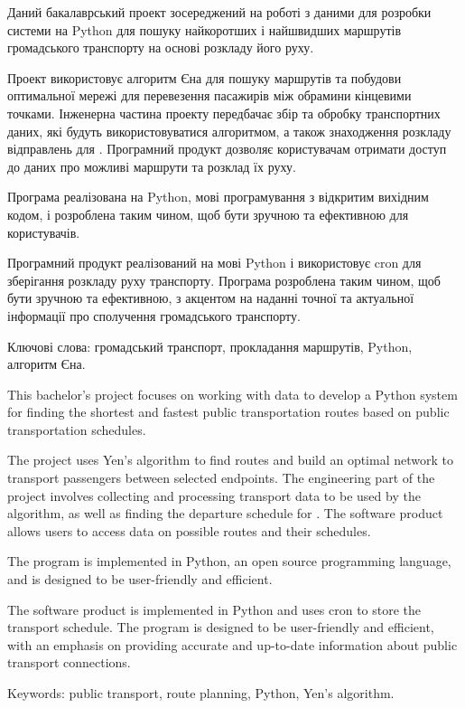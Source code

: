 \abstractUkr


Даний бакалаврський проект зосереджений на роботі з даними для розробки системи на Python для пошуку найкоротших і найшвидших маршрутів громадського транспорту на основі розкладу його руху. 

Проект використовує алгоритм Єна для пошуку маршрутів та побудови оптимальної мережі для перевезення пасажирів між обрамини кінцевими точками. Інженерна частина проекту передбачає збір та обробку транспортних даних, які будуть використовуватися алгоритмом, а також знаходження розкладу відправлень для . Програмний продукт дозволяє користувачам отримати доступ до даних про можливі маршрути та розклад їх руху. 

Програма реалізована на Python, мові програмування з відкритим вихідним кодом, і розроблена таким чином, щоб бути зручною та ефективною для користувачів.

Програмний продукт реалізований на мові Python і використовує cron для зберігання розкладу руху транспорту. Програма розроблена таким чином, щоб бути зручною та ефективною, з акцентом на наданні точної та актуальної інформації про сполучення громадського транспорту.

Ключові слова: громадський транспорт, прокладання маршрутів, Python, алгоритм Єна.


\abstractEng


This bachelor's project focuses on working with data to develop a Python system for finding the shortest and fastest public transportation routes based on public transportation schedules. 

The project uses Yen's algorithm to find routes and build an optimal network to transport passengers between selected endpoints. The engineering part of the project involves collecting and processing transport data to be used by the algorithm, as well as finding the departure schedule for . The software product allows users to access data on possible routes and their schedules. 

The program is implemented in Python, an open source programming language, and is designed to be user-friendly and efficient.

The software product is implemented in Python and uses cron to store the transport schedule. The program is designed to be user-friendly and efficient, with an emphasis on providing accurate and up-to-date information about public transport connections.

Keywords: public transport, route planning, Python, Yen's algorithm.
